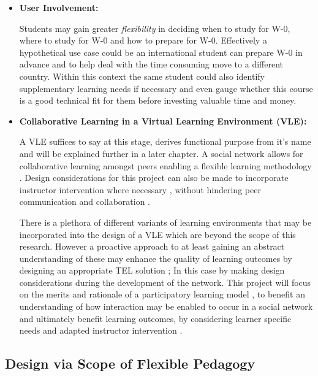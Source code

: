 \begin{itemize}
    \item \textbf{User Involvement:}
    
    Students may gain greater \textit{flexibility} in deciding when to study for W-0, where to study for W-0 and how to prepare for W-0. Effectively a hypothetical use case could be an international student can prepare W-0 in advance and to help deal with the time consuming move to a different country. Within this context the same student could also identify supplementary learning needs if necessary and even gauge whether this course is a good technical fit for them before investing valuable time and money.
       
    \item \textbf{Collaborative Learning in a Virtual Learning Environment (VLE):}
    
    A VLE suffices to say at this stage, derives functional purpose from it's name and will be explained further in a later chapter. A social network allows for collaborative learning amongst peers enabling a flexible learning methodology \cite{Cubukcuo2012}. Design considerations for this project can also be made to incorporate instructor intervention where necessary \cite{Cubukcuo2012,Burge2011}, without hindering peer  communication and collaboration \cite{Cubukcuo2012}.
    
    There is a plethora of different variants of learning environments that may be incorporated into the design of a VLE \cite{Richmond2005,Cubukcuo2012,Burge2011} which are beyond the scope of this research. However a proactive approach to at least gaining an abstract understanding of these may enhance the quality of learning outcomes by designing an appropriate TEL solution \cite{Cubukcuo2012}; In this case by making design considerations during the development of the network. This project will focus on the merits and rationale of a participatory learning model \cite{Yager1990,Yager2004}, to benefit an understanding of how interaction may be enabled to occur in a social network and ultimately benefit learning outcomes, by considering learner specific needs and adapted instructor intervention \cite{Cubukcuo2012}.
    
\end{itemize}

\label{sec:sec01}
\subsection{Design via Scope of Flexible Pedagogy}
\label{subsec:subsec01}

